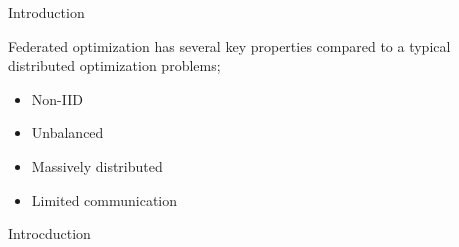 \documentclass{beamer}
\begin{document}
\begin{frame}{Introduction}

	Federated optimization has several key properties compared to a typical distributed
	optimization problems;
	\begin{itemize}
		\item Non-IID
		\item Unbalanced
		\item Massively distributed
		\item Limited communication
	\end{itemize}
\end{frame}

\begin{frame}{Introcduction}
	\begin{figure}
		\centering
\end{figure}
\end{frame}
\end{document}
